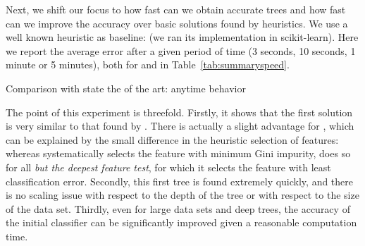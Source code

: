 \documentclass{article}
\begin{document}
Next, we shift our focus to how fast can we obtain accurate trees and how fast can we improve the accuracy over basic solutions found by heuristics.
We use a well known heuristic as baseline: \cart (we ran its implementation in scikit-learn).
Here we report the average error after a given period of time (3 seconds, 10 seconds, 1 minute or 5 minutes), both for \murtree and \blossom in Table~\ref{tab:summaryspeed}.



\begin{table}[htbp]
\begin{center}
\begin{footnotesize}
\tabcolsep=3pt

\end{footnotesize}
\end{center}
\caption{\label{tab:summaryspeed} Comparison with state the of the art: anytime behavior}
\end{table}



The point of this experiment is threefold. Firstly, it shows that the first solution is very similar to that found by \cart. There is actually a slight advantage for \blossom, which can
be explained by the small difference in the heuristic selection of features: whereas \cart systematically selects the feature with minimum Gini impurity, \blossom does so for all \emph{but the deepest feature test}, for which it selects the feature with least classification error. 
Secondly, this first tree
is found extremely quickly, and there is no scaling issue with respect to the depth of the tree or with respect to the size of the data set. Thirdly, even for large data sets and deep trees, the accuracy of the initial classifier can be significantly improved given a reasonable computation time.


\end{document}
